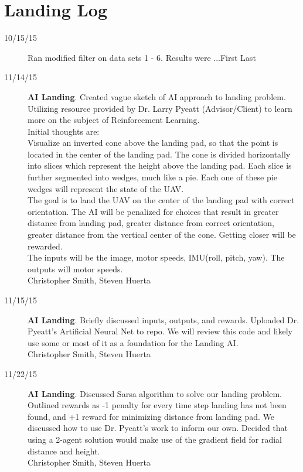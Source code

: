 \section{Landing Log}

\begin{description}
\item [10/15/15]  Ran modified filter on data sets 1 - 6.  Results were ...\hfill{First Last}

\item [11/14/15] \textbf{AI Landing}. Created vague sketch of AI approach to landing problem. Utilizing resource provided by Dr. Larry Pyeatt (Advisor/Client) to learn more on the subject of Reinforcement Learning. \\
Initial thoughts are:\\
Visualize an inverted cone above the landing pad, so that the point is located in the center of the landing pad. The cone is divided horizontally into slices which represent the height above the landing pad. Each slice is further segmented into wedges, much like a pie. Each one of these pie wedges will represent the state of the UAV. \\
The goal is to land the UAV on the center of the landing pad with correct orientation. The AI will be penalized for choices that result in greater distance from landing pad, greater distance from correct orientation, greater distance from the vertical center of the cone. Getting closer will be rewarded.\\
The inputs will be the image, motor speeds, IMU(roll, pitch, yaw). The outputs will motor speeds.\\

\hfill{Christopher Smith, Steven Huerta}

\item [11/15/15] \textbf{AI Landing}. Briefly discussed inputs, outputs, and rewards. Uploaded Dr. Pyeatt's Artificial Neural Net to repo. We will review this code and likely use some or most of it as a foundation for the Landing AI.\\

\hfill{Christopher Smith, Steven Huerta}\

\item [11/22/15] \textbf{AI Landing}. Discussed Sarsa algorithm to solve our landing problem. Outlined rewards as -1 penalty for every time step landing has not been found, and +1 reward for minimizing distance from landing pad. We discussed how to use Dr. Pyeatt's work to inform our own. Decided that using a 2-agent solution would make use of the gradient field for radial distance and height.\\

\hfill{Christopher Smith, Steven Huerta}

\end{description}